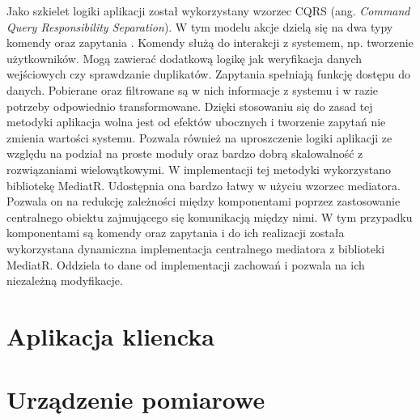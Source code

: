 Jako szkielet logiki aplikacji został wykorzystany wzorzec CQRS 
(ang. \textit{Command Query Responsibility Separation}).
W tym modelu akcje dzielą się na dwa typy komendy oraz zapytania \cite{fowler:cqrs}.
Komendy służą do interakcji z systemem, np. tworzenie użytkowników.
Mogą zawierać dodatkową logikę jak weryfikacja danych wejściowych 
czy sprawdzanie duplikatów.
Zapytania spełniają funkcję dostępu do danych. Pobierane oraz
filtrowane są w nich informacje z systemu i w razie potrzeby
odpowiednio transformowane.
Dzięki stosowaniu się do zasad tej metodyki aplikacja wolna
jest od efektów ubocznych i tworzenie zapytań nie zmienia
wartości systemu. Pozwala również na uproszczenie logiki
aplikacji ze względu na podział na proste moduły oraz bardzo
dobrą skalowalność z rozwiązaniami wielowątkowymi.
W implementacji tej metodyki wykorzystano bibliotekę MediatR.
Udostępnia ona bardzo łatwy w użyciu wzorzec mediatora.
Pozwala on na redukcję zależności między komponentami poprzez
zastosowanie centralnego obiektu zajmującego się komunikacją między nimi\cite{freeman2004head}.
W tym przypadku komponentami są komendy oraz zapytania i do ich realizacji
została wykorzystana dynamiczna implementacja centralnego
mediatora z biblioteki MediatR. Oddziela to dane od implementacji
zachowań i pozwala na ich niezależną modyfikacje.

\section{Aplikacja kliencka}


\section{Urządzenie pomiarowe}
